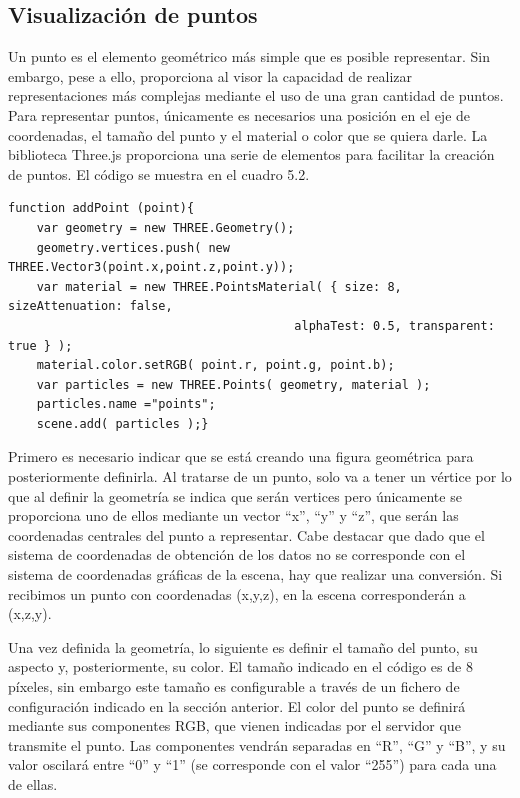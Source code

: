 \subsection{Visualización de puntos}
Un punto es el elemento geométrico más simple que es posible representar. Sin embargo, pese a ello, proporciona al visor la capacidad de realizar representaciones más complejas mediante el uso de una gran cantidad de puntos. Para representar puntos, únicamente es necesarios una posición en el eje de coordenadas, el tamaño del punto y el material o color que se quiera darle. 
La biblioteca Three.js proporciona una serie de elementos para facilitar la creación de puntos. El código se muestra en el cuadro 5.2.
\begin{lstlisting}[caption= Creación y visualización de puntos, label=cod.crearpunto]
function addPoint (point){
	var geometry = new THREE.Geometry();
	geometry.vertices.push( new THREE.Vector3(point.x,point.z,point.y));
	var material = new THREE.PointsMaterial( { size: 8, sizeAttenuation: false, 
										alphaTest: 0.5, transparent: true } );
	material.color.setRGB( point.r, point.g, point.b);
	var particles = new THREE.Points( geometry, material );
	particles.name ="points";
	scene.add( particles );}
\end{lstlisting}
Primero es necesario indicar que se está creando una figura geométrica para posteriormente definirla. Al tratarse de un punto, solo va a tener un vértice por lo que al definir la geometría se indica que serán vertices pero únicamente se proporciona uno de ellos mediante un vector ``x'', ``y'' y  ``z'', que serán las coordenadas centrales del punto a representar. Cabe destacar que dado que el sistema de coordenadas de obtención de los datos no se corresponde con el sistema de coordenadas gráficas de la escena, hay que realizar una conversión. Si recibimos un punto con coordenadas (x,y,z), en la escena corresponderán a (x,z,y). 


Una vez definida la geometría, lo siguiente es definir el tamaño del punto, su aspecto y, posteriormente, su color. El tamaño indicado en el código es de 8 píxeles, sin embargo este tamaño es configurable a través de un fichero de configuración indicado en la sección anterior. El color del punto se definirá mediante sus componentes RGB, que vienen indicadas por el servidor que transmite el punto. Las componentes vendrán separadas en ``R'', ``G'' y ``B'', y su valor oscilará entre ``0'' y ``1'' (se corresponde con el valor ``255'') para cada una de ellas.

